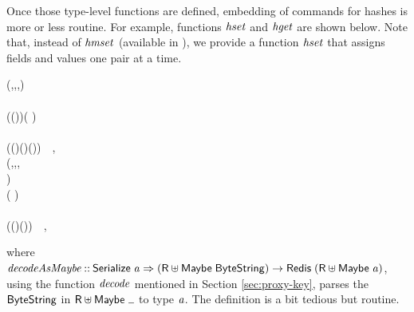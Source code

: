 Once those type-level functions are defined, embedding of \Hedis{} commands for
hashes is more or less routine. For example, functions \ensuremath{\Varid{hset}} and \ensuremath{\Varid{hget}}
are shown below. Note that, instead of \ensuremath{\Varid{hmset}} (available in \Hedis{}), we
provide a function \ensuremath{\Varid{hset}} that assigns fields and values one pair at a time.
\begin{hscode}\SaveRestoreHook
{}%
%
%
%
%
\>[B]{}\<[7]%
\>[7]{}\mathbin{::}(\;,\;,\;,\;\;){}\<[E]%
\\
\>[7]{}\Rightarrow {}\;\to {}\;\to {}\<[E]%
\\
\>[7]{}\to {}\;\;(\;\;\;\;(\;))\;( \uplus {}){}\<[E]%
\\
\>[B]{}\;\;\;\mathrel{=}{}\<[E]%
\\
\>[B]{}\<[3]%
\>[3]{}\;(\;(\;)\;(\;)\;(\;))~~,{}\<[E]%
\\[\blanklineskip]%
\>[B]{}\<[7]%
\>[7]{}\mathbin{::}({}\<[13]%
\>[13]{}\;,\;,\;,{}\<[E]%
\\
\>[13]{}\;\mathrel{\sim}\;\;\;){}\<[E]%
\\
\>[7]{}\Rightarrow {}\;\to {}\;\to {}\;\;\;( \uplus {}\;){}\<[E]%
\\
\>[B]{}\;\;\mathrel{=}{}\<[E]%
\\
\>[B]{}\<[3]%
\>[3]{}\;(\;(\;)\;(\;)\bind {})~~,{}\<[E]%
\ColumnHook
\end{hscode}\resethooks
where \ensuremath{\Varid{decodeAsMaybe}\mathbin{::}\Conid{Serialize}\;\Varid{a}\Rightarrow (\Conid{R} \uplus \Conid{Maybe}\;\Conid{ByteString})\to \Conid{Redis}\;(\Conid{R} \uplus \Conid{Maybe}\;\Varid{a})}, using the function \ensuremath{\Varid{decode}}
mentioned in Section \ref{sec:proxy-key}, parses the \ensuremath{\Conid{ByteString}} in
\ensuremath{\Conid{R} \uplus \Conid{Maybe}\;\anonymous } to type \ensuremath{\Varid{a}}. The definition is a bit tedious but
routine.

